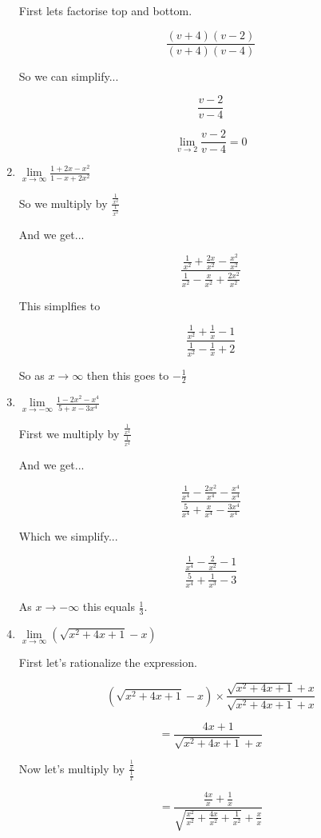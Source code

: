 \documentclass{article}
\begin{document}
\begin{enumerate}
			First lets factorise top and bottom.

			$$\frac{(v+4)(v-2)}{(v+4)(v-4)}$$

			So we can simplify...

			$$\frac{v-2}{v-4}$$

			$$\lim \limits _{v \to 2} \frac{v-2}{v-4} = 0$$

		\item $\lim \limits _{x \to \infty} \frac{1 + 2x - x^2}{1-x+2x^2}$

		So we multiply by $\frac{\frac{1}{x^2}}{\frac{1}{x^2}}$

		And we get...

		$$\frac{ \frac{1}{x^2} + \frac{2x}{x^2} - \frac{x^2}{x^2}}{\frac{1}{x^2} - \frac{x}{x^2} + \frac{2x^2}{x^2}}$$

		This simplfies to

		$$\frac{ \frac{1}{x^2} + \frac{1}{x} - 1}{\frac{1}{x^2} - \frac{1}{x} + 2}$$

		So as $x \to \infty$ then this goes to $-\frac{1}{2}$

		\item $\lim \limits _{x \to -\infty} \frac{1 - 2x^2 - x^4}{5 + x - 3x^4}$

			First we multiply by $\frac{ \frac{1}{x^4} }{ \frac{1}{x^4} }$

			And we get...

			$$\frac{ \frac{1}{x^4} - \frac{2x^2}{x^4} - \frac{x^4}{x^4} }{\frac{5}{x^4} + \frac{x}{x^4} - \frac{3x^4}{x^4} }$$

			Which we simplify...

			$$\frac{ \frac{1}{x^4} - \frac{2}{x^2} - 1}{ \frac{5}{x^4} + \frac{1}{x^3} - 3}$$

			As $x \to -\infty$ this equals $\frac{1}{3}$.

		\item $\lim \limits _{x \to \infty} (\sqrt{x^2 + 4x + 1} - x)$

			First let's rationalize the expression.

			$$(\sqrt{x^2 + 4x + 1} - x) \times \frac{\sqrt{x^2 + 4x + 1} + x}{\sqrt{x^2 + 4x + 1} + x}$$

			$$ = \frac{4x + 1}{\sqrt{x^2 + 4x + 1} + x}$$

			Now let's multiply by $\frac{\frac{1}{x}}{\frac{1}{x}}$

			$$ = \frac{ \frac{4x}{x} + \frac{1}{x} }{ \sqrt{ \frac{x^2}{x^2} + \frac{4x}{x^2} + \frac{1}{x^2}} + \frac{x}{x}}$$


\end{enumerate}
\end{document}
